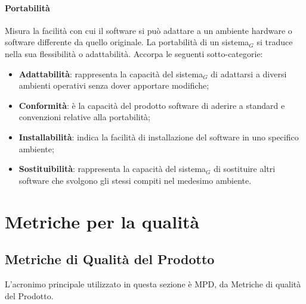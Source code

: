 \documentclass[10pt]{article}
\begin{document}
\begin{justify}
            \paragraph{Portabilità}
            Misura la facilità con cui il software si può adattare a un ambiente hardware o software differente da quello originale. La portabilità di un sistema$_G$ si
            traduce nella sua flessibilità o adattabilità. Accorpa le seguenti sotto-categorie:
            \begin{itemize}
                \item \textbf{Adattabilità}: rappresenta la capacità del sistema$_G$ di adattarsi a diversi ambienti operativi senza dover apportare modifiche;
                \item \textbf{Conformità}: è la capacità del prodotto software di aderire a standard e convenzioni relative alla portabilità;
                \item \textbf{Installabilità}: indica la facilità di installazione del software in uno specifico ambiente;
                \item \textbf{Sostituibilità}: rappresenta la capacità del sistema$_G$ di sostituire altri software che svolgono gli stessi compiti nel medesimo ambiente.
            \end{itemize}

\newpage

\section{Metriche per la qualità}
\label{metriche_qualita}
\subsection{Metriche di Qualità del Prodotto}
L'acronimo principale utilizzato in questa sezione è MPD, da Metriche di qualità del Prodotto.


\end{justify}
\end{document}
